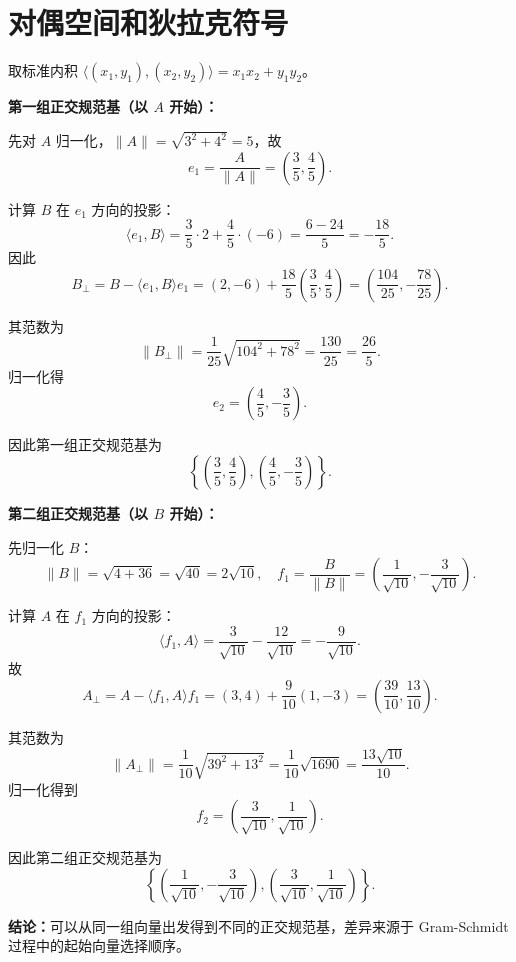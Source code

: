 ﻿%
\section{对偶空间和狄拉克符号}

\begin{solution}

\answer
取标准内积 $\langle (x_1,y_1),(x_2,y_2)\rangle=x_1x_2+y_1y_2$。

\textbf{第一组正交规范基（以 $A$ 开始）：}

先对 $A$ 归一化，$\|A\|=\sqrt{3^2+4^2}=5$，故
\[
e_1=\frac{A}{\|A\|}=\left(\frac{3}{5},\frac{4}{5}\right).
\]

计算 $B$ 在 $e_1$ 方向的投影：
\[
\langle e_1,B\rangle=\frac{3}{5}\cdot 2+\frac{4}{5}\cdot(-6)=\frac{6-24}{5}=-\frac{18}{5}.
\]
因此
\[
B_{\perp}=B-\langle e_1,B\rangle e_1=(2,-6)+\frac{18}{5}\left(\frac{3}{5},\frac{4}{5}\right)
=\left(\frac{104}{25},-\frac{78}{25}\right).
\]

其范数为
\[
\|B_{\perp}\|=\frac{1}{25}\sqrt{104^2+78^2}=\frac{130}{25}=\frac{26}{5}.
\]
归一化得
\[
e_2=\left(\frac{4}{5},-\frac{3}{5}\right).
\]

因此第一组正交规范基为
\[
\left\{\left(\frac{3}{5},\frac{4}{5}\right),\left(\frac{4}{5},-\frac{3}{5}\right)\right\}.
\]

\textbf{第二组正交规范基（以 $B$ 开始）：}

先归一化 $B$：
\[
\|B\|=\sqrt{4+36}=\sqrt{40}=2\sqrt{10},\quad
f_1=\frac{B}{\|B\|}=\left(\frac{1}{\sqrt{10}},-\frac{3}{\sqrt{10}}\right).
\]

计算 $A$ 在 $f_1$ 方向的投影：
\[
\langle f_1,A\rangle=\frac{3}{\sqrt{10}}-\frac{12}{\sqrt{10}}=-\frac{9}{\sqrt{10}}.
\]
故
\[
A_{\perp}=A-\langle f_1,A\rangle f_1
=(3,4)+\frac{9}{10}(1,-3)=\left(\frac{39}{10},\frac{13}{10}\right).
\]

其范数为
\[
\|A_{\perp}\|=\frac{1}{10}\sqrt{39^2+13^2}
=\frac{1}{10}\sqrt{1690}=\frac{13\sqrt{10}}{10}.
\]
归一化得到
\[
f_2=\left(\frac{3}{\sqrt{10}},\frac{1}{\sqrt{10}}\right).
\]

因此第二组正交规范基为
\[
\left\{\left(\frac{1}{\sqrt{10}},-\frac{3}{\sqrt{10}}\right),\left(\frac{3}{\sqrt{10}},\frac{1}{\sqrt{10}}\right)\right\}.
\]

\textbf{结论：}可以从同一组向量出发得到不同的正交规范基，差异来源于 Gram-Schmidt 过程中的起始向量选择顺序。
\end{solution}


